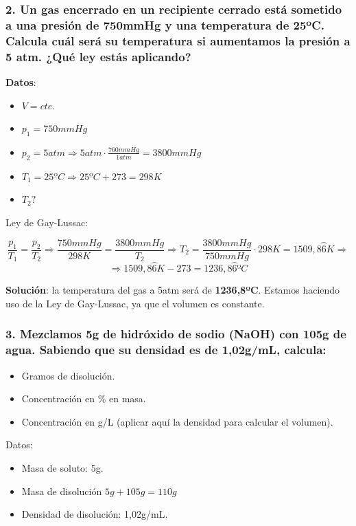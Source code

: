 \documentclass[12pt,a4paper]{article}
\begin{document}
\subsubsection*{2. Un gas encerrado en un recipiente cerrado está sometido a una presión de 750mmHg y una temperatura de 25ºC. Calcula cuál será su temperatura si aumentamos la presión a 5 atm. ¿Qué ley estás aplicando?}

\textbf{Datos}:
\begin{itemize}
	\item \(V = cte.\)
	\item \(p_1 = 750mmHg\)
	\item \(p_2 = 5 atm \Rightarrow 5 atm \cdot \frac{760mmHg}{1atm} = 3800mmHg\)
	\item \(T_1 = 25ºC \Rightarrow 25ºC + 273 = 298K\)
	\item \(T_2?\)
\end{itemize}

Ley de Gay-Lussac:

\[
	\frac{p_1}{T_1} = \frac{p_2}{T_2} \Rightarrow \frac{750mmHg}{298K} = \frac{3800mmHg}{T_2} \Rightarrow T_2 = \frac{3800mmHg}{750mmHg} \cdot 298K = 1509,8\wideparen{6}K\Rightarrow
\]
\[
	\Rightarrow 1509,8\wideparen{6}K - 273 = 1236,8\wideparen{6}ºC
\]

\textbf{Solución}: la temperatura del gas a 5atm será de \textbf{1236,8ºC}. Estamos haciendo uso de la Ley de Gay-Lussac, ya que el volumen es constante.

\subsubsection*{3. Mezclamos 5g de hidróxido de sodio (NaOH) con 105g de agua. Sabiendo que su densidad es de 1,02g/mL, calcula:}

\begin{itemize}
	\item Gramos de disolución.
	\item Concentración en \% en masa.
	\item Concentración en g/L (aplicar aquí la densidad para calcular el volumen).
\end{itemize}

\noindent Datos:
\begin{itemize}
	\item Masa de soluto: 5g.
	\item Masa de disolución \(5g+105g=110g\)
	\item Densidad de disolución: 1,02g/mL.
\end{itemize}
\end{document}
